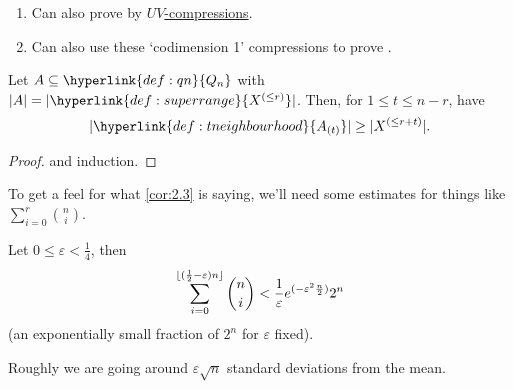 \documentclass{article}
\DeclarePairedDelimiter\floor{\lfloor}{\rfloor}
\let\subset\subseteq
\let\epsilon\varepsilon
\begin{document}
\begin{remark}\leavevmode
  \begin{enumerate}[label=\arabic*.]
    \item Can also prove  by \hyperlink{def:uvcomp}{$UV$-compressions}.
    \item Can also use these `codimension 1' compressions to prove .
  \end{enumerate}
\end{remark}
\begin{ncor}\label{cor:2.3}
  Let $A \subset \hyperlink{def:qn}{Q_n}$ with $|A| = |\hyperlink{def:superrange}{X^{(\leq r)}}|$. Then, for $1 \leq t \leq n-r$, have
  \begin{equation*}
    |\hyperlink{def:tneighbourhood}{A_{(t)}}| \geq |X^{(\leq r + t)}|.
  \end{equation*}
\end{ncor}
\begin{proof}
   and induction.
\end{proof}
To get a feel for what \cref{cor:2.3} is saying, we'll need some estimates for things like $\sum_{i=0}^r \binom{n}{i}$.
\begin{nprop}\label{prop:2.4}
  Let $0 \leq \epsilon < \frac{1}{4}$, then
  \begin{equation*}
    \sum_{i=0}^{\floor{(\frac{1}{2} - \epsilon) n}} \binom{n}{i} < \frac{1}{\epsilon} e^{(-\epsilon^2 \frac{n}{2})} 2^n
  \end{equation*}
  (an exponentially small fraction of $2^n$ for $\epsilon$ fixed).
\end{nprop}
Roughly we are going around $\epsilon \sqrt{n}$ standard deviations from the mean.
\end{document}
